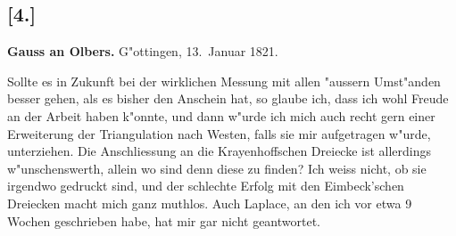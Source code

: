 \documentclass[12pt,a4paper]{article}
\theoremstyle{plain}
\theoremstyle{definition}
\theoremstyle{remark}
\begin{document}
\newpage
\subsection*{[4.]}

\noindent \textbf{Gauss an Olbers.} G"ottingen, 13.~Januar 1821.

\medskip
\noindent Sollte es in Zukunft bei der wirklichen Messung mit allen "aussern Umst"anden besser gehen, als es bisher den Anschein hat, so glaube ich, dass ich wohl Freude an der Arbeit haben k"onnte, und dann w"urde ich mich auch recht gern einer Erweiterung der Triangulation nach Westen, falls sie mir aufgetragen w"urde, unterziehen. Die Anschliessung an die Krayenhoffschen Dreiecke ist allerdings w"unschenswerth, allein wo sind denn diese zu finden? Ich weiss nicht, ob sie irgendwo gedruckt sind, und der schlechte Erfolg mit den Eimbeck'schen Dreiecken macht mich ganz muthlos. Auch Laplace, an den ich vor etwa 9 Wochen geschrieben habe, hat mir gar nicht geantwortet.
\end{document}
